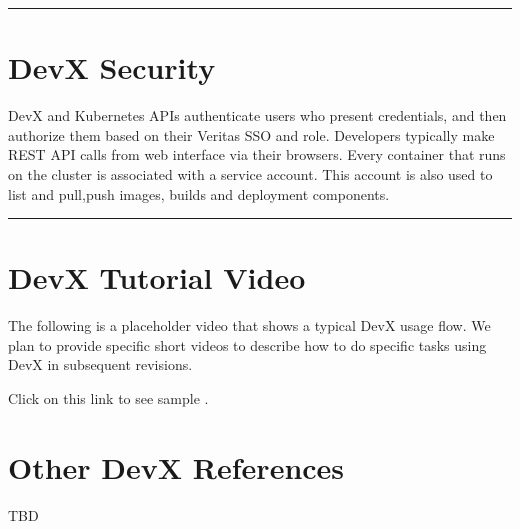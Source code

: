 \documentclass[letterpaper,10pt,english]{sphinxmanual}
\begin{document}
\bigskip\hrule\bigskip



\chapter{DevX Security}
\label{\detokenize{devx:para-sec}}\label{\detokenize{devx:devx-security}}
DevX and Kubernetes APIs authenticate users who present credentials, and then authorize them based on their Veritas SSO and role. Developers typically make REST API calls from web interface via their browsers. Every container that runs on the cluster is associated with a service account. This account is also used to list and pull,push images, builds and deployment components.


\bigskip\hrule\bigskip



\chapter{DevX Tutorial Video}
\label{\detokenize{devx:para-tutorial}}\label{\detokenize{devx:devx-tutorial-video}}
The following is a placeholder video that shows a typical DevX usage flow.  We plan to provide specific short videos to describe how to do specific tasks using DevX in subsequent revisions.

Click on this link to see sample {\hyperref[\detokenize{devx:devx-tutorial-video}]{}}.


\chapter{Other DevX References}
\label{\detokenize{devx:other-devx-references}}
TBD



\renewcommand{\indexname}{Index}
\printindex
\end{document}
